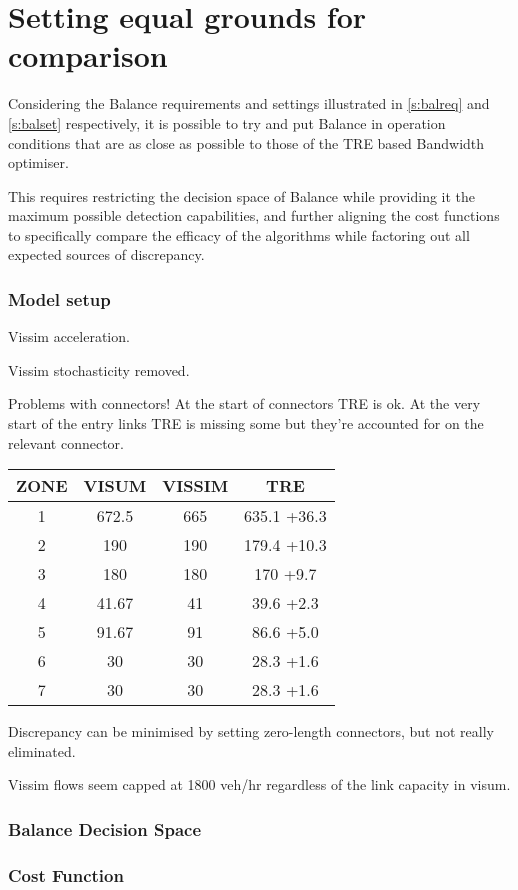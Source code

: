 \section{Setting equal grounds for comparison}

Considering the Balance requirements and settings illustrated in \ref{s:balreq} and \ref{s:balset} respectively, it is possible to try and put Balance in operation conditions that are as close as possible to those of the TRE based Bandwidth optimiser.

This requires restricting the decision space of Balance while providing it the maximum possible detection capabilities, and further aligning the cost functions to specifically compare the efficacy of the algorithms while factoring out all expected sources of discrepancy.

\subsubsection{Model setup}

Vissim acceleration.

Vissim stochasticity removed.

Problems with connectors!
At the start of connectors TRE is ok.
At the very start of the entry links TRE is missing some but they're accounted for on the relevant connector.

\begin{tabular}{|c|c|c|c|}
\hline 
ZONE & VISUM & VISSIM & TRE \\ 
\hline 
1 & 672.5 & 665 & 635.1 +36.3\\ 
2 & 190 & 190 & 179.4 +10.3\\ 
3 & 180 & 180 & 170 +9.7\\ 
4 & 41.67 & 41 & 39.6 +2.3\\ 
5 & 91.67 & 91 & 86.6 +5.0\\ 
6 & 30 & 30 & 28.3 +1.6\\ 
7 & 30 & 30 & 28.3 +1.6\\ 
\hline 
\end{tabular} 

Discrepancy can be minimised by setting zero-length connectors, but not really eliminated.


Vissim flows seem capped at 1800 veh/hr regardless of the link capacity in visum.


\subsubsection{Balance Decision Space}


\subsubsection{Cost Function}

